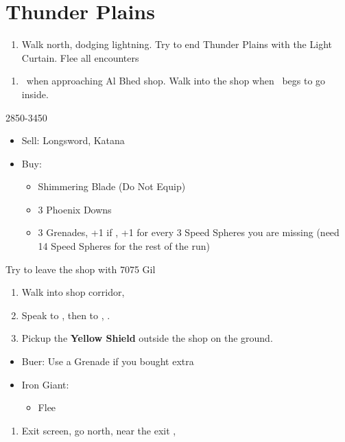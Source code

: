 \chapter{Thunder Plains}

\begin{enumerate}
	\item Walk north, dodging lightning. Try to end Thunder Plains with the Light Curtain. Flee all encounters
\end{enumerate}
\begin{enumerate}[resume]
	\item \sd\ when approaching Al Bhed shop. Walk into the shop when \rikku\ begs to go inside.
\end{enumerate}
\begin{shop}{2850-3450}
	\begin{itemize}
		\item Sell: Longsword, Katana
		\item Buy:
		      \begin{itemize}
			      \item Shimmering Blade (Do Not Equip)
			      \item 3 Phoenix Downs
			      \item 3 Grenades, +1 if \blitzloss, +1 for every 3 Speed Spheres you are missing (need 14 Speed Spheres for the rest of the run)
		      \end{itemize}
	\end{itemize}
	Try to leave the shop with 7075 Gil
\end{shop}
\begin{enumerate}[resume]
	\item Walk into shop corridor, \cs[2:00]
	\item Speak to \auron, then to \rikku, \sd.
	\item Pickup the \textbf{Yellow Shield} outside the shop on the ground.
\end{enumerate}

\begin{encounters}
	\begin{itemize}
		\item Buer: Use a Grenade if you bought extra
		\item Iron Giant:
			\begin{itemize}
				\tidusf Defend
				\switch{\wakka}{\rikku}
				\rikkuf Steal Light Curtain
				\enemyf Attacks \rikku
				\auronf Defend
				\item Flee
			\end{itemize}
	\end{itemize}
\end{encounters}
\begin{enumerate}[resume]
	\item Exit screen, go north, near the exit \sd, \cs[3:10]
\end{enumerate}